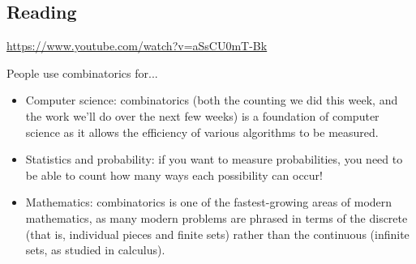 



\subsection*{Reading}
\begin{center}
\begin{tcolorbox}[width=0.8\textwidth,colback={white},title={\textbf{Go and watch...}},colbacktitle=black,coltitle=white]
  \textcolor{black}{\url{https://www.youtube.com/watch?v=aSsCU0mT-Bk}}
\end{tcolorbox}
\end{center}

\begin{center}
\begin{tcolorbox}[width=0.8\textwidth,colback={white},title={\textbf{What's it good for?}},colbacktitle=MidnightBlue,coltitle=white]
  People use combinatorics for...
  \begin{itemize}
    \item Computer science: combinatorics (both the counting we did this week, and the work we'll do over the next few weeks) is a
          foundation of computer science as it allows the efficiency of various algorithms to be measured.
    \item Statistics and probability: if you want to measure probabilities, you need to be able to count how many ways each possibility
          can occur!
    \item Mathematics: combinatorics is one of the fastest-growing areas of modern mathematics, as many modern problems are phrased in
          terms of the discrete (that is, individual pieces and finite sets) rather than the continuous (infinite sets, as studied in calculus).
  \end{itemize}
\end{tcolorbox}
\end{center}

